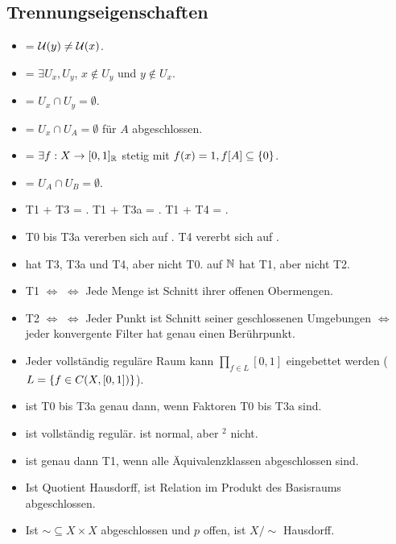 \documentclass[8pt]{extarticle}
\begin{document}
\subsection*{Trennungseigenschaften}
\begin{itemize}
	\item {} = $\mathcal{U}(y) \neq \mathcal{U}(x)$.
	\item {} = $\exists U_x, U_y$, $x \notin U_y$ und $y \notin U_x$. 
	\item {} = $U_x \cap U_y = \emptyset$. 
	\item {} = $U_x \cap U_A = \emptyset$ für $A$ abgeschlossen. 
	\item {} = $\exists f : X \to [0,1]_{\mathbb{R}}$ stetig mit $f(x) = 1, f[A] \subseteq \qty{0}$. \item {} = $U_A \cap U_B = \emptyset$.
	\item T1 + T3 = . T1 + T3a = . T1 + T4 = .
	\item T0 bis T3a vererben sich auf . T4 vererbt sich auf .
	\item {} hat T3, T3a und T4, aber nicht T0.  auf $\mathbb{N}$ hat T1, aber nicht T2.
	\item T1 $\Leftrightarrow$  $\Leftrightarrow$ Jede Menge ist Schnitt ihrer offenen Obermengen.
	\item T2 $\Leftrightarrow$  $\Leftrightarrow$ Jeder Punkt ist Schnitt seiner geschlossenen Umgebungen $\Leftrightarrow$ jeder konvergente Filter hat genau einen Berührpunkt.
	\item Jeder vollständig reguläre Raum kann  $\prod_{f \in L}[0,1]$ eingebettet werden ($L = \qty{f \in C(X, [0,1])}$).
	\item {} ist T0 bis T3a genau dann, wenn Faktoren T0 bis T3a sind.
	\item {} ist vollständig regulär.  ist normal, aber $^2$ nicht. 
	\item {} ist genau dann T1, wenn alle Äquivalenzklassen abgeschlossen sind. 
	\item Ist Quotient Hausdorff, ist Relation im Produkt des Basisraums abgeschlossen. 
	\item Ist $\sim \subseteq X \times X$ abgeschlossen und $p$ offen, ist $X/\sim$ Hausdorff.

\end{itemize}
\end{document}
